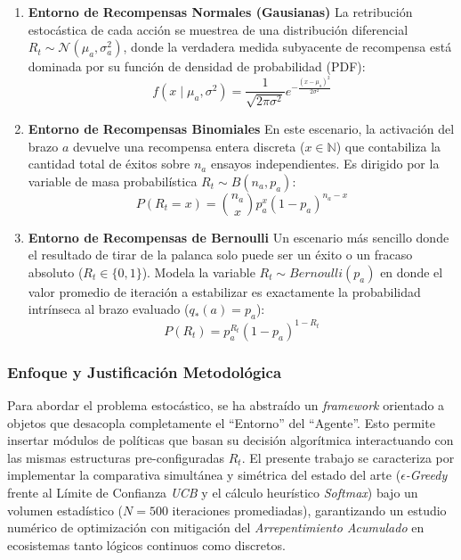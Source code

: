 \begin{enumerate}
\def\labelenumi{\arabic{enumi}.}
\item
  \textbf{Entorno de Recompensas Normales (Gausianas)} La retribución
  estocástica de cada acción se muestrea de una distribución diferencial
  \(R_t \sim \mathcal{N}(\mu_a, \sigma_a^2)\), donde la verdadera medida
  subyacente de recompensa está dominada por su función de densidad de
  probabilidad (PDF):
  \[ f(x \mid \mu_a, \sigma^2) = \frac{1}{\sqrt{2\pi\sigma^2}} e^{-\frac{(x - \mu_a)^2}{2\sigma^2}} \]
\item
  \textbf{Entorno de Recompensas Binomiales} En este escenario, la
  activación del brazo \(a\) devuelve una recompensa entera discreta
  (\(x \in \mathbb{N}\)) que contabiliza la cantidad total de éxitos
  sobre \(n_a\) ensayos independientes. Es dirigido por la variable de
  masa probabilística \(R_t \sim B(n_a, p_a)\):
  \[ P(R_t=x) = \binom{n_a}{x} p_a^x (1 - p_a)^{n_a - x} \]
\item
  \textbf{Entorno de Recompensas de Bernoulli} Un escenario más sencillo
  donde el resultado de tirar de la palanca solo puede ser un éxito o un
  fracaso absoluto (\(R_t \in \{0, 1\}\)). Modela la variable
  \(R_t \sim Bernoulli(p_a)\) en donde el valor promedio de iteración a
  estabilizar es exactamente la probabilidad intrínseca al brazo
  evaluado (\(q_*(a) = p_a\)):
  \[ P(R_t) = p_a^{R_t} (1 - p_a)^{1 - R_t} \]
\end{enumerate}

\subsubsection{Enfoque y Justificación
Metodológica}\label{enfoque-y-justificaciuxf3n-metodoluxf3gica}

Para abordar el problema estocástico, se ha abstraído un
\emph{framework} orientado a objetos que desacopla completamente el
``Entorno'' del ``Agente''. Esto permite insertar módulos de políticas
que basan su decisión algorítmica interactuando con las mismas
estructuras pre-configuradas \(R_t\). El presente trabajo se caracteriza
por implementar la comparativa simultánea y simétrica del estado del
arte (\emph{\(\epsilon\)-Greedy} frente al Límite de Confianza
\emph{UCB} y el cálculo heurístico \emph{Softmax}) bajo un volumen
estadístico (\(N=500\) iteraciones promediadas), garantizando un estudio
numérico de optimización con mitigación del \emph{Arrepentimiento
Acumulado} en ecosistemas tanto lógicos continuos como discretos.

